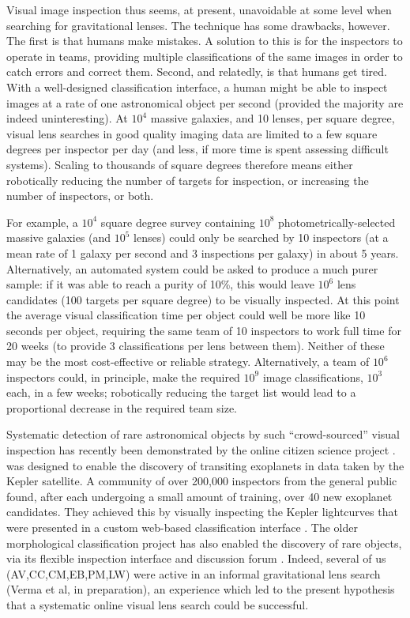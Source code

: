 \documentclass[useAMS,usenatbib,a4paper]{mn2e}
\begin{document}
Visual image inspection thus seems, at present, unavoidable at some level when
searching for gravitational lenses. The technique has some drawbacks, however.
The first is that humans make mistakes. A solution to this is for the inspectors
to operate in teams, providing multiple classifications of the same images in
order to catch errors and correct them. Second, and relatedly, is that humans
get tired. With a well-designed classification interface, a human might be able
to inspect images at a rate of one astronomical object per second (provided the
majority are indeed uninteresting). At $10^4$ massive galaxies, and 10 lenses,
per square degree, visual lens searches in good quality imaging data are limited
to a few square degrees per inspector per day (and less, if more time is spent
assessing difficult systems). Scaling to thousands of square degrees therefore
means either robotically reducing the number of targets for inspection, or
increasing the number of inspectors, or both.

For example, a $10^4$ square degree survey containing $10^8$
photometrically-selected massive galaxies (and $10^5$ lenses) could only be
searched by 10 inspectors (at a mean rate of 1 galaxy per second and 3
inspections per galaxy) in about 5 years. Alternatively,  an automated system
could be asked to produce a much purer sample: if it was able to reach a purity
of 10\%, this would leave  $10^6$ lens candidates (100 targets per square
degree) to be visually inspected.  At this point the average visual
classification time per object could well be more like 10 seconds per object,
requiring the same  team of 10 inspectors to work full time for 20 weeks (to
provide 3 classifications  per lens between them). Neither of these may be the
most cost-effective or reliable strategy. Alternatively, a team of $10^6$
inspectors could, in principle, make the required $10^9$ image classifications,
$10^3$ each, in a few weeks; robotically reducing the target list would lead to
a proportional decrease in the required team size.

Systematic detection of rare astronomical objects by such ``crowd-sourced''
visual inspection has recently been demonstrated by the online citizen science
project \PH \citep{SchwambEtal2012}.
\PH was designed to enable the discovery of transiting exoplanets in data taken
by the Kepler satellite. A community of over 200,000 inspectors from the general
public found, after each undergoing a small amount of training, over 40 new
exoplanet candidates. They achieved this by visually inspecting the Kepler
lightcurves that were presented in a custom web-based classification interface
\citep{WangEtal2013}.
The older \GZ morphological classification
project \citep{LintottEtal2008} has also enabled the discovery of rare objects,
via its flexible inspection interface and discussion forum
\citep{LintottEtal2009}. Indeed, several of us (AV,CC,CM,EB,PM,LW) were
active in an informal \GZ gravitational lens search (Verma et al, in
preparation), an experience which led to the present hypothesis that a
systematic online visual lens search could be successful.
\end{document}
